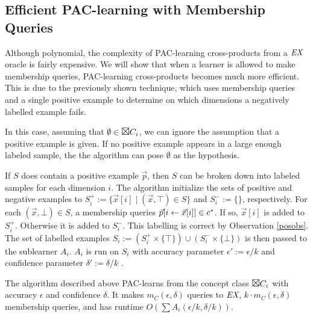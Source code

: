 \subsection{Efficient PAC-learning with Membership Queries}

Although polynomial, the complexity of PAC-learning cross-products from a $\emph{EX}$ oracle is fairly expensive. 
We will show that when a learner is allowed to make membership queries, PAC-learning cross-products becomes much more efficient. 
This is due to the previously shown technique, which uses membership queries and a single positive example to determine on which dimensions a negatively labelled example fails. 

In this case, assuming that $\emptyset \in \Boxtimes C_i$, we can ignore the assumption that a positive example is given. 
If no positive example appears in a large enough labeled sample, the the algorithm can pose $\emptyset$ as the hypothesis.






If $S$ does contain a positive example $\vec{p}$, then $S$ can be broken down into labeled samples for each dimension $i$. 
The algorithm initialize the sets of positive and negative examples to $S^+_i := \{ \vec{x}[i] \mid  (\vec{x}, \top) \in S\}$ and $S^-_i := \{ \}$, respectively.
For each $(\vec{x}, \bot) \in S$, a membership queries $\vec{p}[i \leftarrow \vec{x}[i]] \in c^*$. 
If so, $\vec{x}[i] $ is added to $S^+_i$.
Otherwise it is added to $S^-_i$.
This labelling is correct by Observation \ref{posobs}.
The set of labelled examples $S_i := (S_i^+ \times \{\top\}) \cup (S_i^- \times \{\bot\})$ is then passed to the sublearner $A_i$.
$A_i$ is run on $S_i$ with accuracy parameter $\epsilon' := \epsilon / k$ and confidence parameter $\delta' := \delta / k$ .


\begin{proposition}
The algorithm described above PAC-learns from the concept class $\Boxtimes C_i$ with accuracy $\epsilon$ and confidence $\delta$.
It makes $m_C(\epsilon, \delta)$ queries to $\emph{EX}$, $k \cdot m_C(\epsilon, \delta)$ membership queries, and has runtime $O(\sum A_i(\epsilon / k, \delta / k))$.
\end{proposition}
